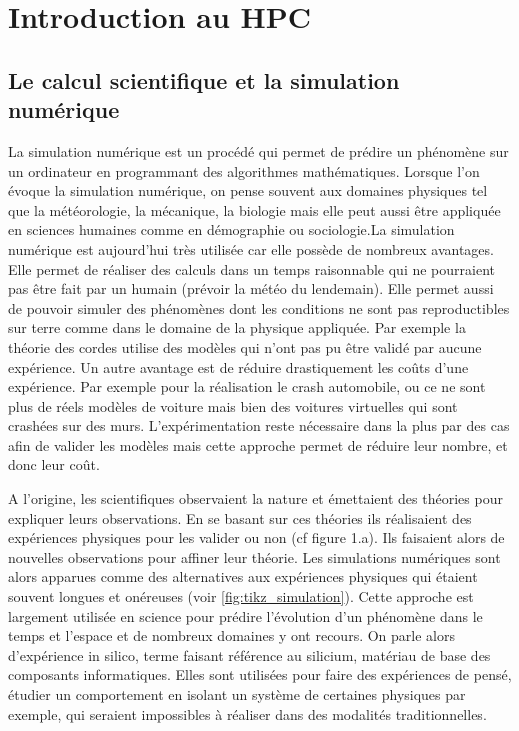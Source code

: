 \section{Introduction au HPC}\label{sec:hpc_intro}


\subsection{Le calcul scientifique et la simulation numérique}

    La simulation numérique est un procédé qui permet de prédire un phénomène sur un ordinateur en programmant des algorithmes mathématiques. Lorsque l'on évoque la simulation numérique, on pense souvent aux domaines physiques tel que la météorologie, la mécanique, la biologie mais elle peut aussi être appliquée en sciences humaines comme en démographie ou sociologie.La simulation numérique est aujourd'hui très utilisée car elle possède de nombreux avantages. Elle permet de réaliser des calculs dans un temps raisonnable qui ne pourraient pas être fait par un humain (prévoir la météo du lendemain). Elle permet aussi de pouvoir simuler des phénomènes dont les conditions ne sont pas reproductibles sur terre comme dans le domaine de la physique appliquée. Par exemple la théorie des cordes utilise des modèles qui n'ont pas pu être validé par aucune expérience. Un autre avantage est de réduire drastiquement les coûts d'une expérience. Par exemple pour la réalisation le crash automobile, ou ce ne sont plus de réels modèles de voiture mais bien des voitures virtuelles qui sont crashées sur des murs. L'expérimentation reste nécessaire dans la plus par des cas afin de valider les modèles mais cette approche permet de réduire leur nombre, et donc leur coût.
    
    
    A l'origine, les scientifiques observaient la nature et émettaient des théories pour expliquer leurs observations. En se basant sur ces théories ils réalisaient des expériences physiques pour les valider ou non (cf figure 1.a). Ils faisaient alors de nouvelles observations pour affiner leur théorie. Les simulations numériques sont alors apparues comme des alternatives aux expériences physiques qui étaient souvent longues et onéreuses (voir \autoref{fig:tikz_simulation}). Cette approche est largement utilisée en science pour prédire l'évolution d'un phénomène dans le temps et l'espace et de nombreux domaines y ont recours. On parle alors d'expérience in silico, terme faisant référence au silicium, matériau de base des composants informatiques. Elles sont utilisées pour faire des expériences de pensé, étudier un comportement en isolant un système de certaines physiques par exemple, qui seraient impossibles à réaliser dans des modalités traditionnelles.
    

